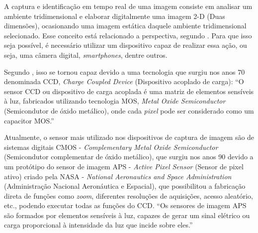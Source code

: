 A captura e identificação em tempo real de uma imagem consiste em analisar um ambiente tridimensional e elaborar digitalmente uma imagem 2-D (Duas dimensões), ocasionando uma imagem estática daquele ambiente tridimensional selecionado. Esse conceito está relacionado a perspectiva, segundo . Para que isso seja possível, é necessário utilizar um dispositivo capaz de realizar essa ação, ou seja, uma câmera digital, \textit{smartphones}, dentre outros.

Segundo , isso se tornou capaz devido a uma tecnologia que surgiu nos anos 70 denominada CCD, \textit{Charge Coupled Device} (Dispositivo acoplado de carga): “O sensor CCD ou dispositivo de carga acoplada é uma matriz de elementos sensíveis à luz, fabricados utilizando tecnologia MOS, \textit{Metal Oxide Semiconductor} (Semicondutor de óxido metálico), onde cada \textit{pixel} pode ser considerado como um capacitor MOS.”

Atualmente, o sensor mais utilizado nos dispositivos de captura de imagem são de sistemas digitais CMOS - \textit{Complementary Metal Oxide Semiconductor} (Semicondutor complementar de óxido metálico), que surgiu nos anos 90 devido a um protótipo do sensor de imagem APS - \textit{Active Pixel Sensor} (Sensor de pixel ativo) criado pela NASA - \textit{National Aeronautics and Space Administration} (Administração Nacional Aeronáutica e Espacial), que possibilitou a fabricação direta de funções como \textit{zoom}, diferentes resoluções de aquisições, acesso aleatório, etc., podendo executar todas as funções do CCD. “Os sensores de imagem APS são formados por elementos sensíveis à luz, capazes de gerar um sinal elétrico ou carga proporcional à intensidade da luz que incide sobre eles.” \cite{CHMIELEWSKI2009}
